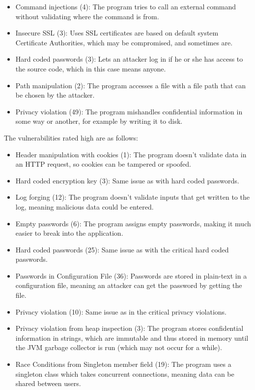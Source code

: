 \documentclass{report} %
\begin{document}
  \begin{itemize}
  \item Command injections (4): The program tries to call an external command
    without validating where the command is from.
  \item Insecure SSL (3): Uses SSL certificates are based on default system
    Certificate Authorities, which may be compromised, and sometimes are.
  \item Hard coded passwords (3): Lets an attacker log in if he or she has access
    to the source code, which in this case means anyone.
  \item Path manipulation (2): The program accesses a file with a file path that
    can be chosen by the attacker.
  \item Privacy violation (49): The program mishandles confidential information
    in some way or another, for example by writing it to disk.
  \end{itemize}

  The vulnerabilities rated high are as follows:

  \begin{itemize}
  \item Header manipulation with cookies (1): The program doesn't validate data
    in an HTTP request, so cookies can be tampered or spoofed.
  \item Hard coded encryption key (3): Same issue as with hard coded passwords.
  \item Log forging (12): The program doesn't validate inputs that get written
    to the log, meaning malicious data could be entered.
  \item Empty passwords (6): The program assigns empty passwords, making it much
    easier to break into the application.
  \item Hard coded passwords (25): Same issue as with the critical hard coded passwords.
  \item Passwords in Configuration File (36): Passwords are stored in plain-text
    in a configuration file, meaning an attacker can get the password by getting
    the file.
  \item Privacy violation (10): Same issue as in the critical privacy violations.
  \item Privacy violation from heap inspection (3): The program stores
    confidential information in strings, which are immutable and thus stored in
    memory until the JVM garbage collector is run (which may not occur for a
    while). 
  \item Race Conditions from Singleton member field (19): The program uses a
    singleton class which takes concurrent connections, meaning data can be
    shared between users.
  \end{itemize}
      
\end{document}
